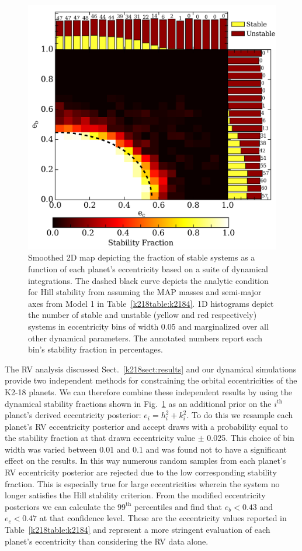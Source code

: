 \begin{figure}
\centering
\includegraphics[width=0.6\hsize]{figures/ecc_stability.png}
\caption[Stability fraction versus the injected orbital eccentricities of K2-18b and c.]
  {\small Smoothed 2D map depicting the fraction of stable systems as a function of each planet's
  eccentricity based on a suite of dynamical integrations.
  The dashed black curve depicts the analytic condition for Hill stability from
  \cite{gladman93} assuming the MAP masses and semi-major axes from Model 1 in
  Table~\ref{k218table:k2184}. 1D histograms depict the number of
  stable and unstable (yellow and red respectively) systems in
  eccentricity bins of width 0.05 and marginalized over all other dynamical parameters.
  The annotated numbers report each bin's stability fraction in percentages. 
  \label{k218fig:dynam}}
\end{figure}


The RV analysis discussed Sect.~\ref{k218sect:results} and our dynamical simulations provide two
independent methods for constraining the orbital eccentricities of the K2-18 planets. We can
therefore combine these independent results by using the dynamical stability fractions
shown in Fig.~\ref{k218fig:dynam} as an additional prior on the $i^{\text{th}}$ planet's derived
eccentricity posterior: $e_i = h_i^2 + k_i^2$. To do this we resample each planet's RV eccentricity
posterior and accept draws with a probability equal to the stability fraction at that drawn
eccentricity value $\pm$ 0.025. This choice of bin width was varied between 0.01 and 0.1 and
was found not to have a significant effect on the results. In this way numerous random samples
from each planet's RV eccentricity posterior
are rejected due to the low corresponding stability fraction. This is especially true
for large eccentricities wherein the system no longer satisfies the Hill stability criterion.
From the modified eccentricity posteriors we can calculate the
$99^{\text{th}}$ percentiles and find that $e_b < 0.43$ and $e_c < 0.47$   
at that confidence level. These are the eccentricity values reported in Table~\ref{k218table:k2184}
and represent a more stringent evaluation of each planet's eccentricity than considering the RV data
alone.


